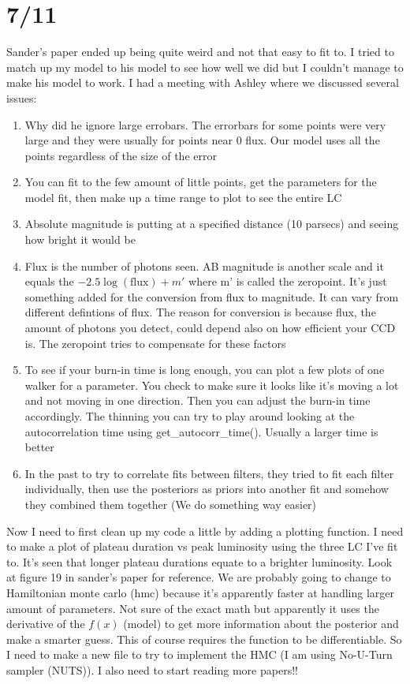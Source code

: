 \documentclass[12pt]{article}
\begin{document}
\section{7/11}
Sander's paper ended up being quite weird and not that easy to fit to. I tried to match up my model to his model to see how well we did but I couldn't manage to make his model to work. I had a meeting with Ashley where we discussed several issues:
\begin{enumerate} 
        \item Why did he ignore large errobars. The errorbars for some points were very large and they were usually for points near 0 flux. Our model uses all the points regardless of the size of the error
        \item You can fit to the few amount of little points, get the parameters for the model fit, then make up a time range to plot to see the entire LC
        \item Absolute magnitude is putting at a specified distance (10 parsecs) and seeing how bright it would be
        \item Flux is the number of photons seen. AB magnitude is another scale and it equals the $-2.5\log(\text{flux}) + m'$ where m' is called the zeropoint. It's just something added for the conversion from flux to magnitude. It can vary from different defintions of flux. The reason for conversion is because flux, the amount of photons you detect, could depend also on how efficient your CCD is. The zeropoint tries to compensate for these factors 
        \item To see if your burn-in time is long enough, you can plot a few plots of one walker for a parameter. You check to make sure it looks like it's moving a lot and not moving in one direction. Then you can adjust the burn-in time accordingly. The thinning you can try to play around looking at the autocorrelation time using get\_autocorr\_time(). Usually a larger time is better
        \item In the past to try to correlate fits between filters, they tried to fit each filter individually, then use the posteriors as priors into another fit and somehow they combined them together (We do something way easier)
\end{enumerate}
Now I need to first clean up my code a little by adding a plotting function. I need to make a plot of plateau duration vs peak luminosity using the three LC I've fit to. It's seen that longer plateau durations equate to a brighter luminosity. Look at figure 19 in sander's paper for reference. We are probably going to change to Hamiltonian monte carlo (hmc) because it's apparently faster at handling larger amount of parameters. Not sure of the exact math but apparently it uses the derivative of the $f(x)$ (model) to get more information about the posterior and make a smarter guess. This of course requires the function to be differentiable. So I need to make a new file to try to implement the HMC (I am using No-U-Turn sampler (NUTS)). I also need to start reading more papers!!
\end{document}

